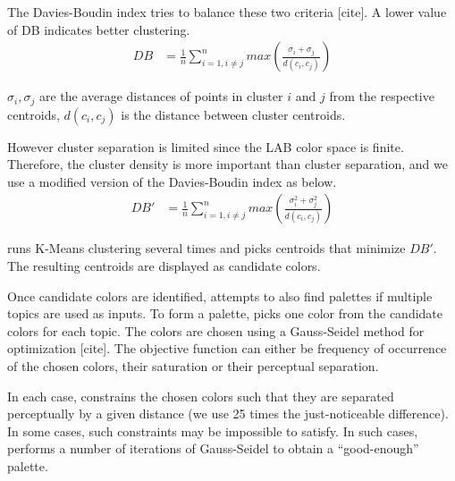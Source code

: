 The Davies-Boudin index tries to balance these two criteria [cite].  A lower value of DB indicates better clustering.
\begin{align}
DB &= \frac{1}{n} \sum_{i=1, i \neq j}^{n}max\left(\frac{\sigma_{i} + \sigma_{j}}{d(c_{i}, c_{j})}\right)
\end{align}

$\sigma_{i}, \sigma_{j}$ are the average distances of points in cluster $i$ and $j$ from the respective centroids, $d(c_{i}, c_{j})$ is the distance between cluster centroids.

However  cluster separation is limited since the LAB color space is finite. Therefore, the cluster density is more important than cluster separation, and we use a modified version of the Davies-Boudin index as below.
\begin{align}
DB' &= \frac{1}{n} \sum_{i=1, i \neq j}^{n}max\left(\frac{\sigma_{i}^{2} + \sigma_{j}^{2}}{d(c_{i}, c_{j})}\right)
\end{align}

\system runs K-Means clustering several times and picks centroids that minimize $DB'$. The resulting centroids are displayed as candidate colors.

Once candidate colors are identified, \system attempts to also find palettes if multiple topics are used as inputs. To form a palette, \system picks one color from the candidate colors for each topic. The colors are chosen using a Gauss-Seidel method for optimization [cite]. The objective function can either be frequency of occurrence of the chosen colors, their saturation or their perceptual separation. 

In each case, \system constrains the chosen colors such that they are separated perceptually by a given distance (we use 25 times the just-noticeable difference). In some cases, such constraints may be impossible to satisfy. In such cases, \system performs a number of iterations of Gauss-Seidel to obtain a ``good-enough'' palette.